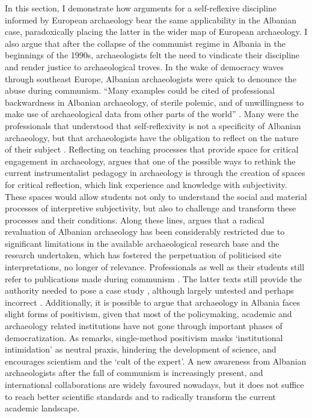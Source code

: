 	In this section, I demonstrate how arguments for a self-reflexive discipline informed by European archaeology bear the same applicability in the Albanian case, paradoxically placing the latter in the wider map of European archaeology. I also argue that after the collapse of the communist regime in Albania in the beginnings of the 1990s, archaeologists felt the need to vindicate their discipline and render justice to archaeological troves.
	In the wake of democracy waves through southeast Europe, Albanian archaeologists were quick to denounce the abuse during communism. ``Many examples could be cited of professional backwardness in Albanian archaeology, of sterile polemic, and of unwillingness to make use of archaeological data from other parts of the world'' \parencite{Miraj1993}. Many were the professionals that understood that self-reflexivity is not a specificity of Albanian archaeology, but that archaeologists have the obligation to reflect on the nature of their subject \parencite[60]{Gramsch2011}.
Reflecting on teaching processes that provide space for critical engagement in archaeology, \textcite[287]{Hamilakis2004} argues that one of the possible ways to rethink the current instrumentalist pedagogy in archaeology is through the creation of spaces for critical reflection, which link experience and knowledge with subjectivity. These spaces would allow students not only to understand the social and material processes of interpretive subjectivity, but also to challenge and transform these processes and their conditions.
	Along these lines, \textcite[371]{Martin2006} argues that a radical revaluation of Albanian archaeology has been considerably restricted due to significant limitations in the available archaeological research base and the research undertaken, which has fostered the perpetuation of politicised site interpretations, no longer of relevance. Professionals as well as their students still refer to publications made during communism \parencite{Hodges2004}. The latter texts still provide the authority needed to pose a case study \parencite[8--9]{Bintliff2011}, although largely untested and perhaps incorrect \parencite[11]{Galaty2006}. 
Additionally, it is possible to argue that archaeology in Albania faces slight forms of positivism, given that most of the policymaking, academic and archaeology related institutions have not gone through important phases of democratization. 
As \textcite[45]{Johnson2010} remarks, single-method positivism masks `institutional intimidation' as neutral praxis, hindering the development of science, and encourages scientism and the `cult of the expert'.
	A new awareness from Albanian archaeologists after the fall of communism is increasingly present, and international collaborations are widely favoured nowadays, but it does not suffice to reach better scientific standards and to radically transform the current academic landscape.
				
